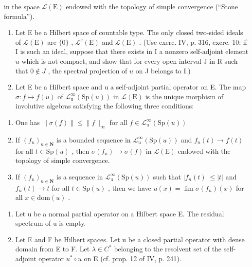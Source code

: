 in the space \(\mathcal{L}(\mathrm{E})\) endowed with the topology of simple convergence (“Stone formula”).

\begin{enumerate}
\def\labelenumi{\arabic{enumi})}
\setcounter{enumi}{2}
\item
  Let E be a Hilbert space of countable type. The only closed two-sided ideals of \(\mathcal{L}(\mathrm{E})\) are \(\{0\}\) , \(\mathcal{L}^{\mathrm{c}}(\mathrm{E})\) and \(\mathcal{L}(\mathrm{E})\) . (Use exerc. IV, p. 316, exerc. 10; if I is such an ideal, suppose that there exists in I a nonzero self-adjoint element \(u\) which is not compact, and show that for every open interval J in R such that \(0 \notin J\) , the spectral projection of \(u\) on J belongs to I.)
\item
  Let E be a Hilbert space and u a self-adjoint partial operator on E. The map \(\sigma\colon f\mapsto f(u)\) of \(\mathcal{L}_{\mathrm{u}}^{\infty}(\mathrm{Sp}(u))\) in \(\mathcal{L}(\mathrm{E})\) is the unique morphism of involutive algebras satisfying the following three conditions:
\end{enumerate}

\begin{enumerate}
\def\labelenumi{(\roman{enumi})}
\item
  One has \(\| \sigma (f)\| \leqslant \| f\|_{\infty}\) for all \(f\in \mathcal{L}_{\mathrm{u}}^{\infty}(\mathrm{Sp}(u))\)
\item
  If \((f_n)_{n\in \mathbf{N}}\) is a bounded sequence in \(\mathcal{L}_{\mathrm{u}}^{\infty}(\mathrm{Sp}(u))\) and \(f_{n}(t)\to f(t)\) for all \(t\in \mathrm{Sp}(u)\) , then \(\sigma (f_n)\rightarrow \sigma (f)\) in \(\mathcal{L}(\mathrm{E})\) endowed with the topology of simple convergence.
\item
  If \((f_n)_{n\in \mathbf{N}}\) is a sequence in \(\mathcal{L}_{\mathrm{u}}^{\infty}(\mathrm{Sp}(u))\) such that \(|f_n(t)|\leqslant |t|\) and \(f_{n}(t)\to t\) for all \(t\in \mathrm{Sp}(u)\) , then we have \(u(x) = \lim \sigma (f_n)(x)\) for all \(x\in \mathrm{dom}(u)\) .
\end{enumerate}

\begin{enumerate}
\def\labelenumi{\arabic{enumi})}
\setcounter{enumi}{4}
\item
  Let u be a normal partial operator on a Hilbert space E. The residual spectrum of u is empty.
\item
  Let E and F be Hilbert spaces. Let u be a closed partial operator with dense domain from E to F. Let \(\lambda \in C^{*}\) belonging to the resolvent set of the self-adjoint operator \(u^{*} \circ u\) on E (cf. prop. 12 of IV, p. 241).
\end{enumerate}

